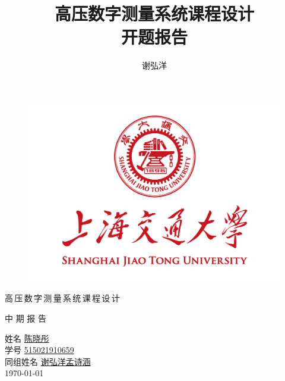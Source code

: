 \documentclass[a4paper,11pt]{ctexart}
\title
{
	\linespread{1.5} \zihao{4}
	高压数字测量系统课程设计 \\ 
	\zihao{2}
	开题报告
}
\author
{
	谢弘洋
}
\date{}
\newcommand{\AuthorC}
{
	
	\zihao{-3}
	\hspace{2em}姓名\hspace{1em} \underline{\hspace{4em}陈晓彤\hspace{4em}}\\
	\vspace{1em}
	\hspace{2em}学号\hspace{1em} \underline{\hspace{2.5em}515021910659\hspace{2.5em}}\\
	\vspace{1em}
	同组姓名\hspace{1em} \underline{\hspace{2em}谢弘洋\hspace{1em}孟诗涵\hspace{2em}}\\
}
\begin{document}
	\pagestyle{plain}

\begin{figure}[t]
	\setlength{\abovecaptionskip}{-10mm}
	\setlength{\belowcaptionskip}{-60mm}
	\centering
	\includegraphics[scale=0.4]{page1.png}
\end{figure}

\begin{center}
	高\,压\,数\,字\,测\,量\,系\,统\,课\,程\,设\,计 \\
	\vspace{0.7em}
	
	中\hspace{0.5em} 期\hspace{0.5em} 报\hspace{0.5em} 告\\
	\vspace{3em}
		
	\AuthorC
	
	\vspace{6em}
	\today
\end{center}
\newpage
\begin{spacing}{1.5}
	\tableofcontents
\end{spacing}
\end{document}
